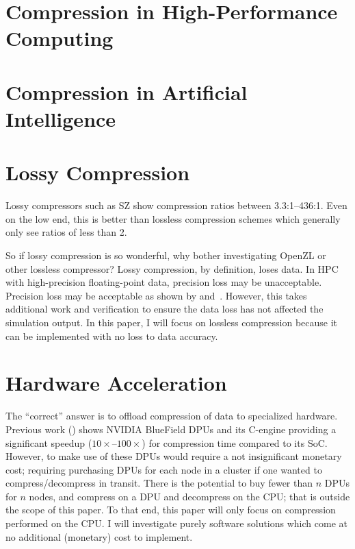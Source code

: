 \section{Compression in High-Performance Computing}
\label{sec:hpc-compression}


\section{Compression in Artificial Intelligence}
\label{sec:ai-compression}


\section{Lossy Compression}
\label{sec:lossy-compression}
Lossy compressors such as SZ show compression ratios between
3.3:1--436:1\cite{di_fast_2016}. Even on the low end, this is better than
lossless compression schemes which generally only see ratios of less than
2\cite{lu_understanding_2018}.

So if lossy compression is so wonderful, why bother investigating OpenZL or
other lossless compressor? Lossy compression, by definition, loses data. In HPC
with high-precision floating-point data, precision loss may be unacceptable.
Precision loss may be acceptable as shown by \cite{di_fast_2016}
and~\cite{lu_understanding_2018}. However, this takes additional work and
verification to ensure the data loss has not affected the simulation output. In
this paper, I will focus on lossless compression because it can be implemented
with no loss to data accuracy.


\section{Hardware Acceleration}
\label{sec:hw-acceleration}
The ``correct'' answer is to offload compression of data to specialized
hardware.\cite{li_performance_2026} Previous work
(\cite{li_accelerating_2024,li_compression_2024}) shows NVIDIA BlueField
DPUs and its C-engine providing a significant speedup ($10\times$--$100\times$)
for compression time compared to its SoC. However, to make use of these DPUs
would require a not insignificant monetary cost; requiring purchasing DPUs for
each node in a cluster if one wanted to compress/decompress in transit. There is
the potential to buy fewer than $n$ DPUs for $n$ nodes, and compress on a DPU
and decompress on the CPU; that is outside the scope of this paper. To that end,
this paper will only focus on compression performed on the CPU\@. I will
investigate purely software solutions which come at no additional (monetary)
cost to implement.
